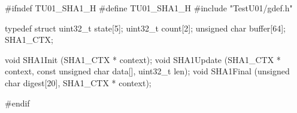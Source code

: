 \code
#ifndef TU01_SHA1_H
#define TU01_SHA1_H
#include "TestU01/gdef.h"


typedef struct
{
   uint32_t state[5];
   uint32_t count[2];
   unsigned char buffer[64];
} SHA1_CTX;


void SHA1Init (SHA1_CTX * context);
void SHA1Update (SHA1_CTX * context, const unsigned char data[], uint32_t len);
void SHA1Final (unsigned char digest[20], SHA1_CTX * context);

#endif
\endcode
